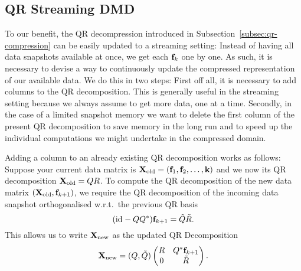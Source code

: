 \subsection{QR Streaming DMD}\label{subsec:qr-update} %

To our benefit, the QR decompression introduced in Subsection~\ref{subsec:qr-compression} can be easily updated to a streaming setting: Instead of having all data snapshots available at once, we get each $\mathbf{f}_k$ one by one. As such, it is necessary to devise a way to continuously update the compressed representation of our available data. We do this in two steps: First off all, it is necessary to add columns to the QR decomposition. This is generally useful in the streaming setting because we always assume to get more data, one at a time. Secondly, in the case of a limited snapshot memory we want to delete the first column of the present QR decomposition to save memory in the long run and to speed up the individual computations we might undertake in the compressed domain.

Adding a column to an already existing QR decomposition works as follows: Suppose your current data matrix is $\mathbf{X}_\text{old} = (\mathbf{f}_1, \mathbf{f}_2, \dots, \mathbf{k})$ and we now its QR decomposition $\mathbf{X}_\text{old} = Q R$. To compute the QR decomposition of the new data matrix $(\mathbf{X}_\text{old}, \mathbf{f}_{k + 1})$, we require the QR decomposition of the incoming data snapshot orthogonalised w.r.t.\ the previous QR basis
\begin{equation*}
    (\mathop{}\!\mathrm{id}_{} - Q Q^*) \mathbf{f}_{k + 1} = \tilde{Q} \tilde{R}.
\end{equation*}
This allows us to write $\mathbf{X}_\text{new}$ as the updated QR Decomposition
\begin{equation*}
    \mathbf{X}_\text{new} = (Q, \tilde{Q}) \begin{pmatrix}
        R & Q^* \mathbf{f}_{k + 1} \\
        0 & \tilde{R}
    \end{pmatrix}.
\end{equation*}

